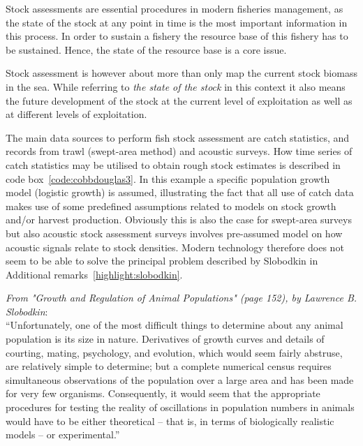 \documentclass[11pt,fleqn]{book} %
\begin{document}
Stock assessments are essential procedures in modern fisheries management, as the state of the stock at any point in time is the most important information in this process. In order to sustain a fishery the resource base of this fishery has to be sustained. Hence, the state of the resource base is a core issue.

Stock assessment is however about more than only map the current stock biomass in the sea. While referring to \textit{the state of the stock} in this context it also means the future development of the stock at the current level of exploitation as well as at different levels of exploitation.

The main data sources to perform fish stock assessment are catch statistics, and records from trawl (swept-area method) and acoustic surveys. How time series of catch statistics may be utilised to obtain rough stock estimates is described in code box~\ref{code:cobbdouglas3}. In this example a specific population growth model (logistic growth) is assumed, illustrating the fact that all use of catch data makes use of some predefined assumptions related to models on stock growth and/or harvest production. Obviously this is also the case for swept-area surveys but also acoustic stock assessment surveys involves pre-assumed model on how acoustic signals relate to stock densities. Modern technology therefore does not seem to be able to solve the principal problem described by Slobodkin in Additional remarks~\ref{highlight:slobodkin}.

\begin{corollary}
\hfill \break
\small{\textit{From "Growth and Regulation of Animal Populations" (page 152), by Lawrence B. Slobodkin}\cite{Slobodkin1961}: \\ \indent \enquote{Unfortunately, one of the most difficult things to determine about any animal population is its size in nature. Derivatives of growth curves and details of courting, mating, psychology, and evolution, which would seem fairly abstruse, are relatively simple to determine; but a complete numerical census requires simultaneous observations of the population over a large area and has been made for very few organisms. Consequently, it would seem that the appropriate procedures for testing the reality of oscillations in population numbers in animals would have to be either theoretical -- that is, in terms of biologically realistic models -- or experimental.}
}
\label{highlight:slobodkin}
\end{corollary}
\end{document}
